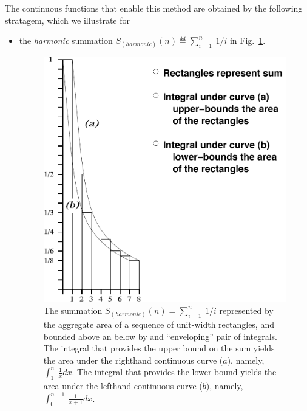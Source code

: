 The continuous functions that enable this method are obtained by the
following stratagem, which we illustrate for
\begin{itemize}
\item
the {\it harmonic} summation $S_{(harmonic)}(n) \eqdef \sum_{i=1}^n
  \ 1/i$ in Fig.~\ref{fig:riemann-harmonic}.
\begin{figure}[htb]
\centerline{
\includegraphics[scale=0.42]{riemann2.pdf}
}
\caption{The summation $S_{(harmonic)}(n) = \sum_{i=1}^n \ 1/i$
  represented by the aggregate area of a sequence of unit-width
  rectangles, and bounded above an below by and ``enveloping'' pair of
  integrals.  The integral that provides the upper bound on the sum
  yields the area under the righthand continuous curve ($a$), namely,
  $\displaystyle \int_1^n \ \frac{1}{x} dx$.  The integral that
  provides the lower bound yields the area under the lefthand
  continuous curve ($b$), namely, $\displaystyle \int_0^{n-1}
  \ \frac{1}{x+1} dx$.}
\label{fig:riemann-harmonic}
\end{figure}


\end{itemize}
